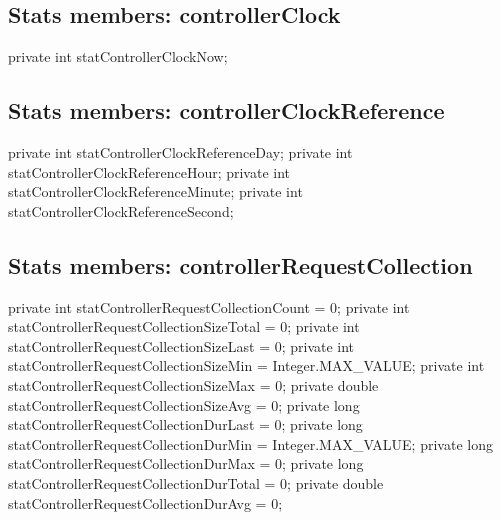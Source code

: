 \subsection{Stats members: controllerClock}
\nwenddocs{}\endmoddef{}
private int    statControllerClockNow;
\nwendcode{}\nwdocspar

\subsection{Stats members: controllerClockReference}
\nwenddocs{}\endmoddef{}
private int    statControllerClockReferenceDay;
private int    statControllerClockReferenceHour;
private int    statControllerClockReferenceMinute;
private int    statControllerClockReferenceSecond;
\nwendcode{}\nwdocspar

\subsection{Stats members: controllerRequestCollection}
\nwenddocs{}\endmoddef{}
private int    statControllerRequestCollectionCount = 0;
private int    statControllerRequestCollectionSizeTotal = 0;
private int    statControllerRequestCollectionSizeLast = 0;
private int    statControllerRequestCollectionSizeMin = Integer.MAX_VALUE;
private int    statControllerRequestCollectionSizeMax = 0;
private double statControllerRequestCollectionSizeAvg = 0;
private long   statControllerRequestCollectionDurLast = 0;
private long   statControllerRequestCollectionDurMin = Integer.MAX_VALUE;
private long   statControllerRequestCollectionDurMax = 0;
private long   statControllerRequestCollectionDurTotal = 0;
private double statControllerRequestCollectionDurAvg = 0;
\nwendcode{}\nwdocspar

